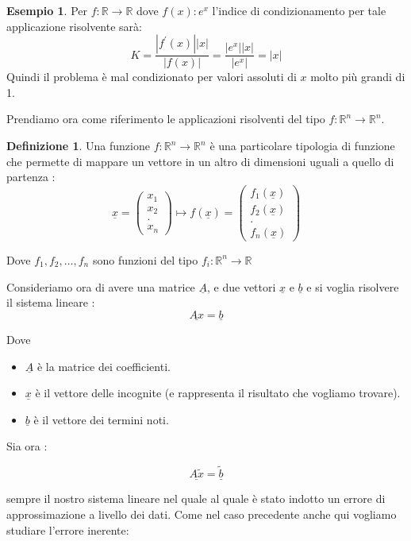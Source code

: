 \documentclass[12pt, a4paper]{book}
\theoremstyle{definition}
\newtheorem{exmp}{Esempio}[section]
\newtheorem{defn}{Definizione}[section]
\newcommand{\VarMtrx}[1]{\ensuremath{\underline{#1}}}
\begin{document}
\begin{flushleft}
\begin{exmp}
Per $f: \mathbb{R} \rightarrow \mathbb{R}$ dove $f(x) : e^{x}$ l'indice di condizionamento per tale applicazione risolvente sarà: 
\[ K = \frac{|f^{'}(x)| |x|}{|f(x)|} = \frac{|e^{x}||x|}{|e^{x}|} = |x| \]
Quindi il problema è mal condizionato per valori assoluti di $x$ molto più grandi di 1.
\end{exmp}

Prendiamo ora come riferimento le applicazioni risolventi del tipo $f: \mathbb{R}^{n} \rightarrow \mathbb{R}^{n}$. 

\begin{defn}
Una funzione  $f: \mathbb{R}^{n} \rightarrow \mathbb{R}^{n}$ è una particolare tipologia di funzione che permette di mappare un vettore in un altro di dimensioni uguali a quello di partenza :  
\[ \VarMtrx{x} = \begin{pmatrix} x_{1} \\ x_{2} \\ .\\ x_{n}  \end{pmatrix} \mapsto f(\VarMtrx{x}) = \begin{pmatrix} f_{1}(\VarMtrx{x}) \\ f_{2}(\VarMtrx{x}) \\ .\\ f_{n}(\VarMtrx{x})  \end{pmatrix}  \]

Dove $f_{1},  f_{2},  \dots,  f_{n}$ sono funzioni del tipo $f_{i}: \mathbb{R}^{n} \rightarrow \mathbb{R}$

\end{defn}

Consideriamo ora di avere una matrice $\VarMtrx{A}$,  e due vettori $\VarMtrx{x}$ e $\VarMtrx{b}$ e si voglia risolvere il sistema lineare : 
\[ \VarMtrx{Ax} = \VarMtrx{b} \]

Dove 
\begin{itemize}
	\item $\VarMtrx{A}$ è la matrice dei coefficienti.
	\item $\VarMtrx{x}$ è il vettore delle incognite (e rappresenta il risultato che vogliamo trovare).
	\item $\VarMtrx{b}$ è il vettore dei termini noti.
\end{itemize}

Sia ora :

\[ \VarMtrx{A\tilde{x}} = \VarMtrx{\tilde{b}} \]

sempre il nostro sistema lineare nel quale al quale è stato indotto un errore di approssimazione a livello dei dati.  Come nel caso precedente anche qui vogliamo studiare l'errore inerente:


\end{flushleft}
\end{document}
